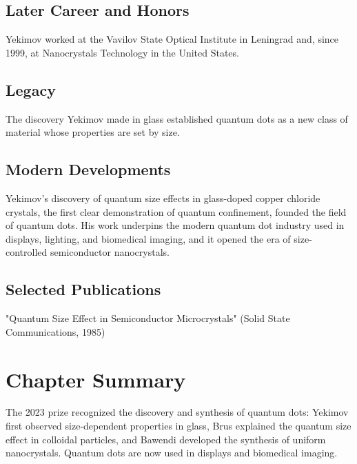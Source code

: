 \subsection*{Later Career and Honors}

Yekimov worked at the Vavilov State Optical Institute in Leningrad and, since 1999, at Nanocrystals Technology in the United States.

\subsection*{Legacy}

The discovery Yekimov made in glass established quantum dots as a new class of material whose properties are set by size.

\subsection*{Modern Developments}

Yekimov's discovery of quantum size effects in glass-doped copper chloride crystals, the first clear demonstration of quantum confinement, founded the field of quantum dots. His work underpins the modern quantum dot industry used in displays, lighting, and biomedical imaging, and it opened the era of size-controlled semiconductor nanocrystals.

\subsection*{Selected Publications}

"Quantum Size Effect in Semiconductor Microcrystals" (Solid State Communications, 1985)

\clearpage

\section*{Chapter Summary}

The 2023 prize recognized the discovery and synthesis of quantum dots: Yekimov first observed size-dependent properties in glass, Brus explained the quantum size effect in colloidal particles, and Bawendi developed the synthesis of uniform nanocrystals. Quantum dots are now used in displays and biomedical imaging.
